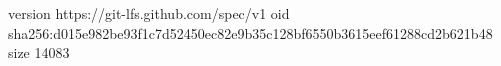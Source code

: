 version https://git-lfs.github.com/spec/v1
oid sha256:d015e982be93f1c7d52450ec82e9b35c128bf6550b3615eef61288cd2b621b48
size 14083
